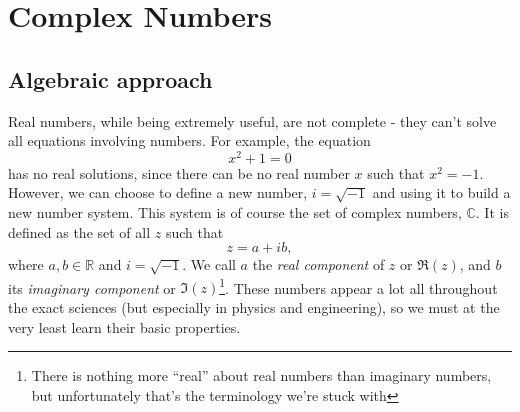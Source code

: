 
\newcommand{\cmplxsol}[1]{
	\coordinate (O) at (0,0);
	\draw[black!20] (1,0) arc (0:360:1);
	\pgfmathsetmacro{\dt}{360/#1}
	\pgfmathsetmacro{\n}{int(#1-1)}
	\pgfplotsinvokeforeach{\n,...,0}{
		\pgfmathsetmacro{\k}{int(##1+1)}
		\draw[very thick, xcol##1] (O) -- ({cos(\dt*##1)},{sin(\dt*##1)}) node[complex]{};
		\node[xcol##1]  at ({1.2*cos(\dt*##1)},{1.2*sin(\dt*##1)}) {$z_{##1}$};
		\draw[xcol##1, fill=xcol##1!20] (O) -- ({0.1*##1},0) arc (0:{\dt*##1}:{0.1*##1}) -- cycle;
	}
}


\section{Complex Numbers}
\subsection{Algebraic approach}
Real numbers, while being extremely useful, are not complete - they can't solve all equations involving numbers. For example, the equation
\begin{equation}
	x^{2} + 1 = 0
	\label{eq:no_real_solutions}
\end{equation}
has no real solutions, since there can be no real number $x$ such that $x^{2}=-1$. However, we can choose to define a new number, $i=\sqrt{-1}$ and using it to build a new number system. This system is of course the set of complex numbers, $\mathbb{C}$. It is defined as the set of all $z$ such that
\begin{equation}
	z = a+ib,
	\label{eq:complex_number}
\end{equation}
where $a,b\in\mathbb{R}$ and $i=\sqrt{-1}$. We call $a$ the \emph{real component} of $z$ or $\Re(z)$, and $b$ its \emph{imaginary component} or $\Im(z)$\footnote{There is nothing more ``real'' about real numbers than imaginary numbers, but unfortunately that's the terminology we're stuck with \shrug}. These numbers appear a lot all throughout the exact sciences (but especially in physics and engineering), so we must at the very least learn their basic properties.

